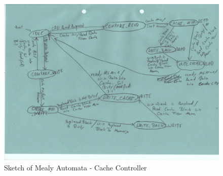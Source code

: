 \begin{figure}
	\centering
	\includegraphics[scale=.8]{pictures/sketch_mealyAutomata}
	\caption{Sketch of Mealy Automata - Cache Controller}
	\label{fig:sketchMealyAutomata}
\end{figure}
